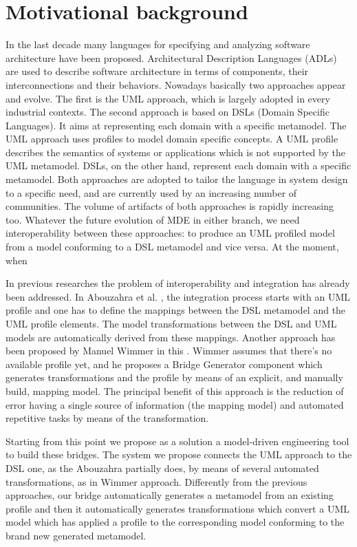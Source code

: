 \section{Motivational background}\label{sec:motivation}



In the last decade many languages for specifying and analyzing software architecture have been proposed. Architectural Description Languages (ADLs) are used to describe software architecture in terms of components, their interconnections and their behaviors. Nowadays basically two approaches appear and evolve. The first is the UML approach, which is largely adopted in every industrial contexts. The second approach is based on DSLs (Domain Specific Languages). It aims at representing each domain with a specific metamodel. The UML approach uses profiles to model domain specific concepts. A UML profile describes the semantics of systems or applications which is not supported by the UML metamodel. DSLs, on the other hand, represent each domain with a specific metamodel. Both approaches are adopted to tailor the language in system design to a specific need, and are currently used by an increasing number of communities. The volume of artifacts of both approaches is rapidly increasing too. Whatever the future evolution of MDE in either branch, we need interoperability between these approaches: to produce an UML profiled model from a model conforming to a DSL metamodel and vice versa. At the moment, when 


In previous researches the problem of interoperability and integration has already been addressed. In Abouzahra et al. \cite{Abouzahra}, the integration process starts with an UML profile and one has to define the mappings between the DSL metamodel and the UML profile elements. The model transformations between the DSL and UML models are automatically derived from these mappings. Another approach has been proposed by Manuel Wimmer in this \cite{Wimmer}. Wimmer assumes that there's no available profile yet, and he proposes a Bridge Generator component which generates transformations and the profile by means of an explicit, and manually build, mapping model. The principal benefit of this approach is the reduction of error having a single source of information (the mapping model) and automated repetitive tasks by means of the transformation.


Starting from this point we propose as a solution a model-driven engineering tool to build these bridges. The system we propose connects the UML approach to the DSL one, as the Abouzahra partially does, by means of several automated transformations, as in Wimmer approach. Differently from the previous approaches, our bridge automatically generates a metamodel from an existing profile and then it automatically generates transformations which convert a UML model which has applied a profile to the corresponding model conforming to the brand new generated metamodel.

